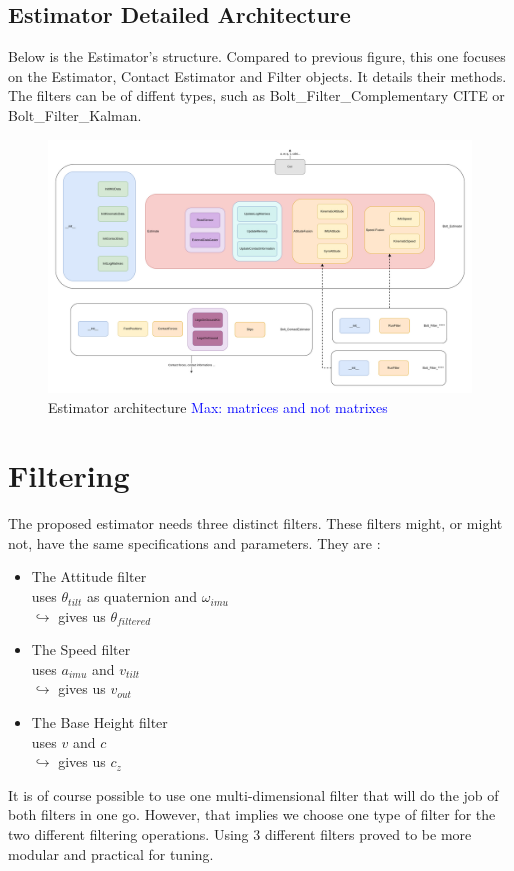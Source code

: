 \documentclass[a4paper,10pt]{article}
\newcommand{\mnaveau}[1]{\textcolor{blue}{Max: #1}}
\begin{document}
\subsection{Estimator Detailed Architecture}
Below is the Estimator's structure. Compared to previous figure, this one focuses on the Estimator, Contact Estimator and Filter objects. It details their methods. The filters can be of diffent types, such as Bolt\_Filter\_Complementary CITE or Bolt\_Filter\_Kalman.
\begin{figure}[H]
\hspace{-2.5cm} 
  \includegraphics[width=\linewidth, angle=0, scale=1.4]{./images/BoltEstimator0_full_200.png}
  \caption{Estimator architecture \mnaveau{matrices and not matrixes}}
\end{figure}


\section{Filtering}
The proposed estimator needs three distinct filters. These filters might, or might not, have the same specifications and parameters. They are :
\begin{itemize}
	\item{The Attitude filter\\
	uses $\theta_{tilt}$ as quaternion and $\omega_{imu}$\\
	$\hookrightarrow$ gives us $\theta_{filtered}$}
	\item{The Speed filter\\
	uses $a_{imu}$ and $v_{tilt}$\\
	$\hookrightarrow$ gives us $v_{out}$}
	\item{The Base Height filter\\
	uses $v$ and $c$\\
	$\hookrightarrow$ gives us $c_z$}
\end{itemize}
It is of course possible to use one multi-dimensional filter that will do the job of both filters in one go. However, that implies we choose one type of filter for the two different filtering operations. Using 3 different filters proved to be more modular and practical for tuning. \\
\end{document}
